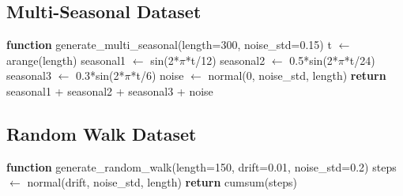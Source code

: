 \documentclass[11pt]{article}
\begin{document}
\subsection{Multi-Seasonal Dataset}

\begin{algorithmic}
\STATE \textbf{function} generate\_multi\_seasonal(length=300, noise\_std=0.15)
\STATE \quad t $\leftarrow$ arange(length)
\STATE \quad seasonal1 $\leftarrow$ sin(2*$\pi$*t/12) 
\STATE \quad seasonal2 $\leftarrow$ 0.5*sin(2*$\pi$*t/24) 
\STATE \quad seasonal3 $\leftarrow$ 0.3*sin(2*$\pi$*t/6) 
\STATE \quad noise $\leftarrow$ normal(0, noise\_std, length)
\STATE \quad \textbf{return} seasonal1 + seasonal2 + seasonal3 + noise
\end{algorithmic}

\subsection{Random Walk Dataset}

\begin{algorithmic}
\STATE \textbf{function} generate\_random\_walk(length=150, drift=0.01, noise\_std=0.2)
\STATE \quad steps $\leftarrow$ normal(drift, noise\_std, length)
\STATE \quad \textbf{return} cumsum(steps)
\end{algorithmic}
\end{document}
